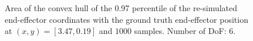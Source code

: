 \documentclass[conference]{IEEEtran}
\begin{document}
\begin{figure}[tbh]
\centering

    \caption{Area of the convex hull of the 0.97 percentile of the re-simulated end-effector coordinates with the ground truth end-effector position at $(x, y) = [3.47, 0.19]$ and $1000$ samples. Number of DoF: 6.}
\end{figure}
\end{document}
